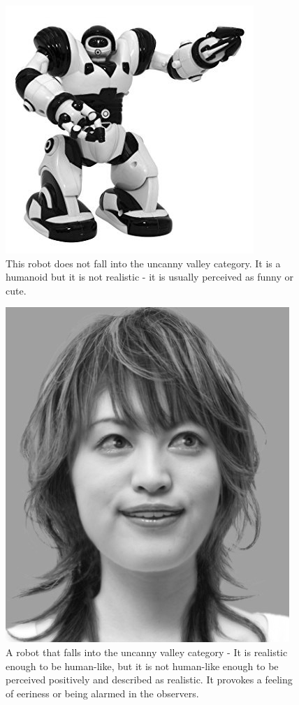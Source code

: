 \begin{figure}[H]
\centerline{\includegraphics[scale=0.4]{img/toyrobot.jpg}}
\caption{This robot does not fall into the uncanny valley category. It is a humanoid but it is not realistic - it is usually perceived as funny or cute.}\label{fig:toyrobot}
\end{figure}

\begin{figure}[H]
\centerline{\includegraphics[scale=0.4]{img/uncannyrobot.png}}
\caption{A robot that falls into the uncanny valley category - It is realistic enough to be human-like, but it is not human-like enough to be perceived positively and described as realistic. It provokes a feeling of eeriness or being alarmed in the observers.}\label{fig:uncannyrobot}
\end{figure}

